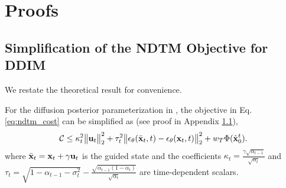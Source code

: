 \section{Proofs}
\label{app:ftm}

\subsection{Simplification of the NDTM Objective for DDIM}
\label{subsec:ddim_proof}
We restate the theoretical result for convenience.
\begin{proposition}
    For the diffusion posterior parameterization in \citet{song2022denoisingdiffusionimplicitmodels}, the objective in Eq. \ref{eq:ndtm_cost} can be simplified as (see proof in Appendix \ref{subsec:ddim_proof}),
    \begin{align}
        {\mathcal{C}} \leq \kappa_t^2\big\Vert {\mathbf{u}}_t \big\Vert_2^2 + \tau_t^2 \big\Vert \epsilon_\theta(\bar{{\mathbf{x}}}_t, t) - \epsilon_\theta({\mathbf{x}}_t, t) \big\Vert_2^2 + w_T\Phi(\hat{{\mathbf{x}}}_0^t).
    \end{align}
    where $\bar{{\mathbf{x}}}_t = {\mathbf{x}}_t + \gamma {\mathbf{u}}_t$ is the guided state and the coefficients $\kappa_t = \frac{\gamma \sqrt{\alpha_{t-1}}}{\sqrt{\alpha_t}}$ and $\tau_t = \sqrt{1 - \alpha_{t-1} - \sigma_t^2} - \frac{\sqrt{\alpha_{t-1}(1 - \alpha_t)}}{\sqrt{\alpha_t}}$ are time-dependent scalars.
\end{proposition}
